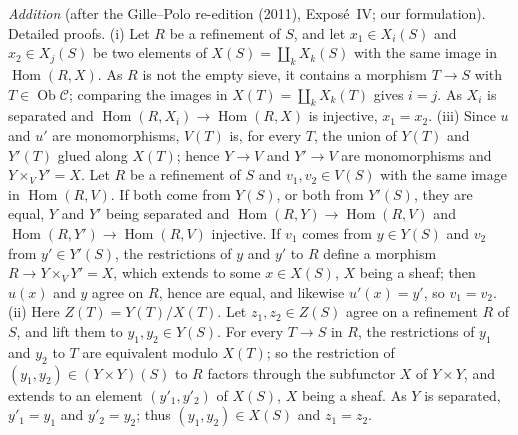 \par\medskip\noindent
\emph{Addition} (after the Gille--Polo re-edition (2011), Expos\'e~IV; our
formulation).  Detailed proofs.
(i) Let \(R\) be a refinement of \(S\), and let \(x_1\in X_i(S)\) and
\(x_2\in X_j(S)\) be two elements of \(X(S)=\coprod_kX_k(S)\) with the same
image in \(\operatorname{Hom}(R,X)\). As \(R\) is not the empty sieve, it
contains a morphism \(T\to S\) with \(T\in\operatorname{Ob}\mathscr C\);
comparing the images in \(X(T)=\coprod_kX_k(T)\) gives \(i=j\). As \(X_i\) is
separated and \(\operatorname{Hom}(R,X_i)\to\operatorname{Hom}(R,X)\) is
injective, \(x_1=x_2\).
(iii) Since \(u\) and \(u'\) are monomorphisms, \(V(T)\) is, for every \(T\),
the union of \(Y(T)\) and \(Y'(T)\) glued along \(X(T)\); hence \(Y\to V\) and
\(Y'\to V\) are monomorphisms and \(Y\times_VY'=X\). Let \(R\) be a refinement
of \(S\) and \(v_1,v_2\in V(S)\) with the same image in
\(\operatorname{Hom}(R,V)\). If both come from \(Y(S)\), or both from
\(Y'(S)\), they are equal, \(Y\) and \(Y'\) being separated and
\(\operatorname{Hom}(R,Y)\to\operatorname{Hom}(R,V)\) and
\(\operatorname{Hom}(R,Y')\to\operatorname{Hom}(R,V)\) injective. If \(v_1\)
comes from \(y\in Y(S)\) and \(v_2\) from \(y'\in Y'(S)\), the restrictions of
\(y\) and \(y'\) to \(R\) define a morphism \(R\to Y\times_VY'=X\), which
extends to some \(x\in X(S)\), \(X\) being a sheaf; then \(u(x)\) and \(y\)
agree on \(R\), hence are equal, and likewise \(u'(x)=y'\), so \(v_1=v_2\).
(ii) Here \(Z(T)=Y(T)/X(T)\). Let \(z_1,z_2\in Z(S)\) agree on a refinement
\(R\) of \(S\), and lift them to \(y_1,y_2\in Y(S)\). For every \(T\to S\) in
\(R\), the restrictions of \(y_1\) and \(y_2\) to \(T\) are equivalent modulo
\(X(T)\); so the restriction of \((y_1,y_2)\in(Y\times Y)(S)\) to \(R\)
factors through the subfunctor \(X\) of \(Y\times Y\), and extends to an
element \((y'_1,y'_2)\) of \(X(S)\), \(X\) being a sheaf. As \(Y\) is
separated, \(y'_1=y_1\) and \(y'_2=y_2\); thus \((y_1,y_2)\in X(S)\) and
\(z_1=z_2\).
\par\medskip

